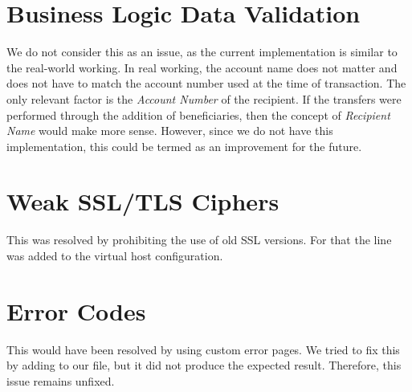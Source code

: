 \section{Business Logic Data Validation}
We do not consider this as an issue, as the current implementation is similar to the real-world working. In real working, the account name does not matter and does not  have to match the account number used at the time of transaction. The only relevant factor is the \textit{Account Number} of the recipient.
If the transfers were performed through the addition of beneficiaries, then the concept of \textit{Recipient Name} would make more sense. However, since we do not have this implementation, this could be termed as an improvement for the future.

\section{Weak SSL/TLS Ciphers}
This was resolved by prohibiting the use of old SSL versions. For that the line  was added to the virtual host configuration.

\section{Error Codes}
This would have been resolved by using custom error pages. We tried to fix this by adding  to our  file, but it did not produce the expected result. Therefore, this issue remains unfixed.

\clearpage